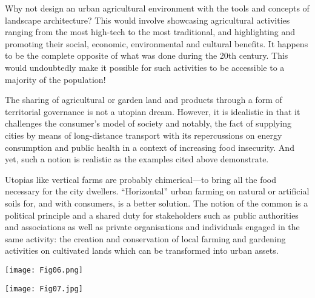 \documentclass[10pt,a4paper]{article}
\begin{document}
\begin{multicols}{2}
Why not design an urban agricultural environment with the tools and concepts of landscape architecture? This would involve showcasing agricultural activities ranging from the most high-tech to the most traditional, and highlighting and promoting their social, economic, environmental and cultural benefits. It happens to be the complete opposite of what was done during the 20th century. This would undoubtedly make it possible for such activities to be accessible to a majority of the population!

The sharing of agricultural or garden land and products through a form of territorial governance is not a utopian dream. However, it is idealistic in that it challenges the consumer's model of society and notably, the fact of supplying cities by means of long-distance transport with its repercussions on energy consumption and public health in a context of increasing food insecurity. And yet, such a notion is realistic as the examples cited above demonstrate.

Utopias like vertical farms are probably chimerical---to bring all the food necessary for the city dwellers. ``Horizontal'' urban farming on natural or artificial soils for, and with consumers, is a better solution.  The notion of the common is a political principle and a shared duty for stakeholders such as public authorities and associations as well as private organisations and individuals engaged in the same activity: the creation and conservation of local farming and gardening activities on cultivated lands which can be transformed into urban assets. 

\vspace{\baselineskip}

\noindent
\begin{minipage}{\columnwidth}
\centering
\resizebox{0.9\columnwidth}{!}
{\texttt{[image: Fig06.png]}}
\end{minipage}

\vspace{\baselineskip}

\noindent
\begin{minipage}{\columnwidth}
\centering
\resizebox{\columnwidth}{!}
{\texttt{[image: Fig07.jpg]}}
\end{minipage}

\end{multicols}
\end{document}
